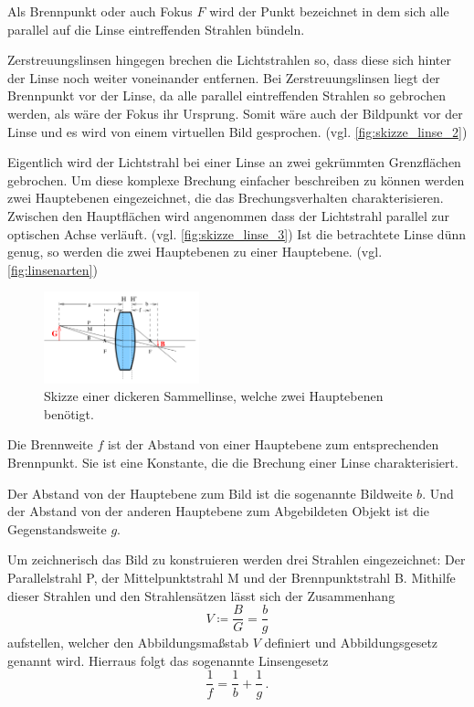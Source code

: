 Als Brennpunkt oder auch Fokus $F$ wird der Punkt bezeichnet in dem sich alle parallel auf die Linse eintreffenden Strahlen bündeln.

Zerstreuungslinsen hingegen brechen die Lichtstrahlen so, dass diese sich hinter der Linse noch weiter voneinander entfernen.
Bei Zerstreuungslinsen liegt der Brennpunkt vor der Linse, da alle parallel eintreffenden Strahlen so gebrochen werden, als wäre der Fokus ihr Ursprung.
Somit wäre auch der Bildpunkt vor der Linse und es wird von einem virtuellen Bild gesprochen. (vgl. \autoref{fig:skizze_linse_2})

Eigentlich wird der Lichtstrahl bei einer Linse an zwei gekrümmten Grenzflächen gebrochen. 
Um diese komplexe Brechung einfacher beschreiben zu können werden zwei Hauptebenen eingezeichnet, die das Brechungsverhalten charakterisieren. 
Zwischen den Hauptflächen wird angenommen dass der Lichtstrahl parallel zur optischen Achse verläuft. (vgl. \autoref{fig:skizze_linse_3})
Ist die betrachtete Linse dünn genug, so werden die zwei Hauptebenen zu einer Hauptebene. (vgl. \autoref{fig:linsenarten})

\begin{figure}
    \centering
    \includegraphics[width=0.4\textwidth]{images/skizze_linse_3.png}
    \caption{Skizze einer dickeren Sammellinse, welche zwei Hauptebenen benötigt.\cite{V408}}
    \label{}
\end{figure}

Die Brennweite $f$ ist der Abstand von einer Hauptebene zum entsprechenden Brennpunkt. 
Sie ist eine Konstante, die die Brechung einer Linse charakterisiert.

Der Abstand von der Hauptebene zum Bild ist die sogenannte Bildweite $b$.
Und der Abstand von der anderen Hauptebene zum Abgebildeten Objekt ist die Gegenstandsweite $g$.

Um zeichnerisch das Bild zu konstruieren werden drei Strahlen eingezeichnet: Der Parallelstrahl P, der Mittelpunktstrahl M und der Brennpunktstrahl B. 
Mithilfe dieser Strahlen und den Strahlensätzen lässt sich der Zusammenhang
\begin{equation}
    V \coloneqq \frac{B}{G} = \frac{b}{g}
\end{equation}
aufstellen, welcher den Abbildungsmaßstab $V$ definiert und Abbildungsgesetz genannt wird.
Hierraus folgt das sogenannte Linsengesetz
\begin{equation}
    \frac{1}{f} = \frac{1}{b} + \frac{1}{g} \, .
\end{equation}

